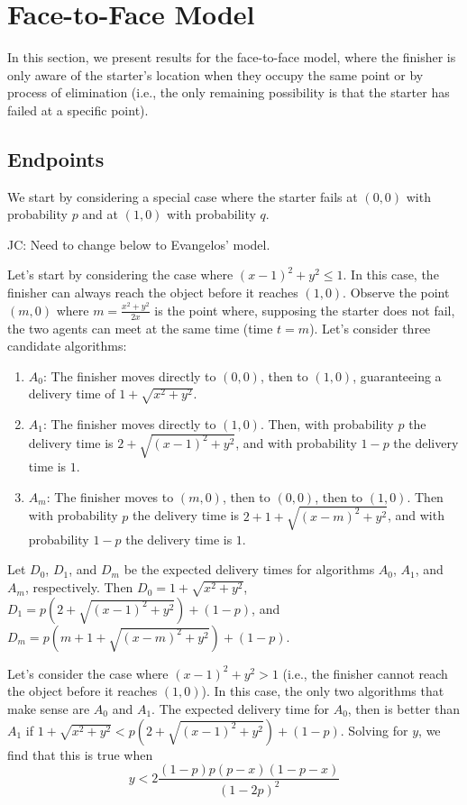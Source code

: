 \documentclass{article}
\newcommand\JC[1]{{\color{Maroon} JC: #1}}         %
\begin{document}
\section{Face-to-Face Model}
In this section, we present results for the face-to-face model, where the finisher is only aware of the starter's location when they occupy the same point or by process of elimination (i.e., the only remaining possibility is that the starter has failed at a specific point).



\subsection{Endpoints}
We start by considering a special case where the starter fails at $(0,0)$ with probability $p$ and at $(1,0)$ with probability $q$.

\JC{Need to change below to Evangelos' model.}

Let's start by considering the case where $(x-1)^2 + y^2 \leq 1$.
In this case, the finisher can always reach the object before it reaches $(1,0)$.
Observe the point $(m, 0)$ where $m = \frac{x^2 + y^2}{2x}$ is the point where, supposing the starter does not fail, the two agents can meet at the same time (time $t = m$).
Let's consider three candidate algorithms:
\begin{enumerate}
    \item $A_0$: The finisher moves directly to $(0,0)$, then to $(1,0)$, guaranteeing a delivery time of $1+\sqrt{x^2 + y^2}$.
    \item $A_1$: The finisher moves directly to $(1,0)$. Then, with probability $p$ the delivery time is $2+\sqrt{(x-1)^2 + y^2}$, and with probability $1-p$ the delivery time is $1$.
    \item $A_m$: The finisher moves to $(m,0)$, then to $(0,0)$, then to $(1,0)$. Then with probability $p$ the delivery time is $2 + 1 + \sqrt{(x-m)^2 + y^2}$, and with probability $1-p$ the delivery time is $1$.
\end{enumerate}
Let $D_0$, $D_1$, and $D_m$ be the expected delivery times for algorithms $A_0$, $A_1$, and $A_m$, respectively.
Then $D_0 = 1 + \sqrt{x^2 + y^2}$, $D_1 = p(2 + \sqrt{(x-1)^2 + y^2}) + (1-p)$, and $D_m = p(m + 1 + \sqrt{(x-m)^2 + y^2}) + (1-p)$.

Let's consider the case where $(x-1)^2 + y^2 > 1$ (i.e., the finisher cannot reach the object before it reaches $(1,0)$).
In this case, the only two algorithms that make sense are $A_0$ and $A_1$.
The expected delivery time for $A_0$, then is better than $A_1$ if $1 + \sqrt{x^2 + y^2} < p(2 + \sqrt{(x-1)^2 + y^2}) + (1-p)$.
Solving for $y$, we find that this is true when 
\begin{equation}
    y < 2 \frac{(1-p)p(p-x)(1-p-x)}{(1-2p)^2} \label{eq:a0:a1}
\end{equation}
\end{document}
